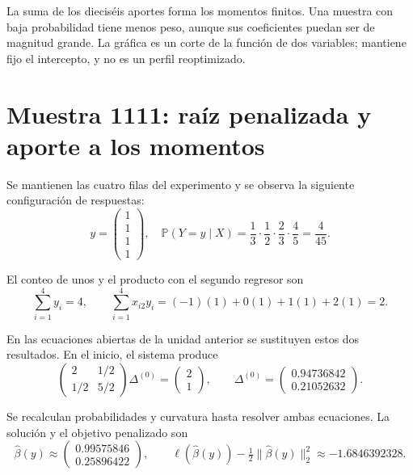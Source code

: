 \documentclass[11pt,a4paper]{article}
\newcommand{\Prob}{\mathbb P}
\begin{document}
La suma de los dieciséis aportes forma los momentos finitos.
Una muestra con baja probabilidad tiene menos peso,
aunque sus coeficientes puedan ser de magnitud grande.
La gráfica es un corte de la función de dos variables;
mantiene fijo el intercepto, y no es un perfil reoptimizado.
\endgroup

\clearpage
\section{Muestra 1111: raíz penalizada y aporte a los momentos}\label{logit140}
\begingroup\small
\setlength{\abovedisplayskip}{4pt}\setlength{\belowdisplayskip}{4pt}
Se mantienen las cuatro filas del experimento y se observa
la siguiente configuración de respuestas:
\[
y=\begin{pmatrix}1\\1\\1\\1\end{pmatrix},\quad \Prob(Y=y\mid X)=\frac{1}{3}\cdot\frac{1}{2}\cdot\frac{2}{3}\cdot\frac{4}{5}=\frac{4}{45}.
\]

El conteo de unos y el producto con el segundo regresor son
\[
\sum_{i=1}^4 y_i=4,\qquad\sum_{i=1}^4x_{i2}y_i=(-1)(1)+0(1)+1(1)+2(1)=2.
\]

En las ecuaciones abiertas de la unidad anterior se sustituyen
estos dos resultados. En el inicio, el sistema produce
\[
\begin{pmatrix}2&1/2\\1/2&5/2\end{pmatrix}\Delta^{(0)}=\begin{pmatrix}2\\1\end{pmatrix},\qquad\Delta^{(0)}=\begin{pmatrix}0.94736842\\0.21052632\end{pmatrix}.
\]

Se recalculan probabilidades y curvatura hasta resolver
ambas ecuaciones. La solución y el objetivo penalizado son
\[
\widehat\beta(y)\approx\begin{pmatrix}0.99575846\\0.25896422\end{pmatrix},\qquad \ell(\widehat\beta(y))-\tfrac12\|\widehat\beta(y)\|_2^2\approx-1.6846392328.
\]
\end{document}
